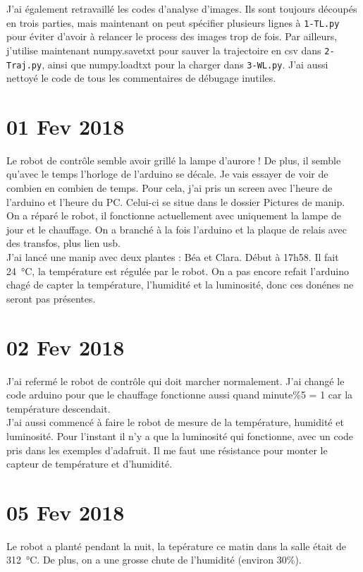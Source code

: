 \documentclass[10pt,a4paper]{article}
\begin{document}
J'ai également retravaillé les codes d'analyse d'images. Ils sont toujours découpés en trois parties, mais maintenant on peut spécifier plusieurs lignes à \texttt{1-TL.py} pour éviter d'avoir à relancer le process des images trop de fois. Par ailleurs, j'utilise maintenant numpy.savetxt pour sauver la trajectoire en csv dans \texttt{2-Traj.py}, ainsi que numpy.loadtxt pour la charger dans \texttt{3-WL.py}. J'ai aussi nettoyé le code de tous les commentaires de débugage inutiles.

\section{01 Fev 2018}
Le robot de contrôle semble avoir grillé la lampe d'aurore ! De plus, il semble qu'avec le temps l'horloge de l'arduino se décale. Je vais essayer de voir de combien en combien de temps. Pour cela, j'ai pris un screen avec l'heure de l'arduino et l'heure du PC. Celui-ci se situe dans le dossier Pictures de manip.\\
On a réparé le robot, il fonctionne actuellement avec uniquement la lampe de jour et le chauffage. On a branché à la fois l'arduino et la plaque de relais avec des transfos, plus lien usb.\\

J'ai lancé une manip avec deux plantes : Béa et Clara. Début à 17h58. Il fait \SI{24}{\celsius}, la température est régulée par le robot. On a pas encore refait l'arduino chagé de capter la température, l'humidité et la luminosité, donc ces donénes ne seront pas présentes.

\section{02 Fev 2018}
J'ai refermé le robot de contrôle qui doit marcher normalement. J'ai changé le code arduino pour que le chauffage fonctionne aussi quand minute\%5 = 1 car la température descendait.\\

J'ai aussi commencé à faire le robot de mesure de la température, humidité et luminosité. Pour l'instant il n'y a que la luminosité qui fonctionne, avec un code pris dans les exemples d'adafruit. Il me faut une résistance pour monter le capteur de température et d'humidité.


\section{05 Fev 2018}
Le robot a planté pendant la nuit, la tepérature ce matin dans la salle était de \SI{312}{\celsius}. De plus, on a une grosse chute de l'humidité (environ 30\%).\\
\end{document}
